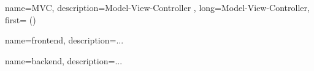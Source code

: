 



{
    name=MVC,
    description={Model-View-Controller%
    },
    long={Model-View-Controller},
    first={} ()
}

{
    name=frontend,
    description={...} %
}

{
    name=backend,
    description={...} %
}